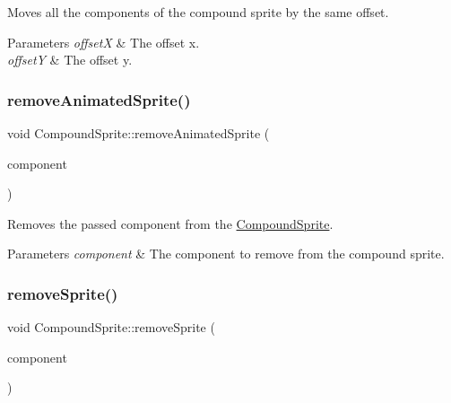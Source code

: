 Moves all the components of the compound sprite by the same offset. 


\begin{DoxyParams}{Parameters}
{\em offsetX} & The offset x.\\
\hline
{\em offsetY} & The offset y.\\
\hline
\end{DoxyParams}
\mbox{\label{class_compound_sprite_ad2cf68974d376edab2d657437c06deb2}} 
\subsubsection{\texorpdfstring{remove\+Animated\+Sprite()}{removeAnimatedSprite()}}
{\footnotesize\ttfamily void Compound\+Sprite\+::remove\+Animated\+Sprite (\begin{DoxyParamCaption}\item[{\hyperlink{class_animated_sprite}{Animated\+Sprite} $\ast$}]{component }\end{DoxyParamCaption})}



Removes the passed component from the \hyperlink{class_compound_sprite}{Compound\+Sprite}. 


\begin{DoxyParams}{Parameters}
{\em component} & The component to remove from the compound sprite. \\
\hline
\end{DoxyParams}
\mbox{\label{class_compound_sprite_ae673d681620b0e8805b692a80c1548a3}} 
\subsubsection{\texorpdfstring{remove\+Sprite()}{removeSprite()}}
{\footnotesize\ttfamily void Compound\+Sprite\+::remove\+Sprite (\begin{DoxyParamCaption}\item[{sf\+::\+Sprite $\ast$}]{component }\end{DoxyParamCaption})}



